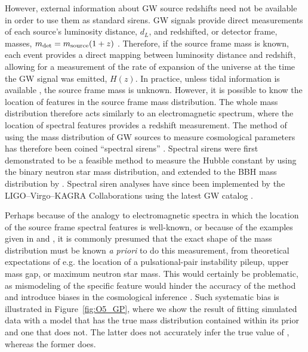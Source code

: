 \documentclass[]{aastex631}
\begin{document}
However, external information about \ac{GW} source redshifts need not be available in order to use them as standard sirens.
\ac{GW} signals provide direct measurements of each source's luminosity distance, $d_L$, and redshifted, or detector frame, masses, $m_{\det}= m_{\text{source}}(1+z)$ \citep[e.g.][]{chen_mass-redshift_2019}.
Therefore, if the source frame mass is known, each event provides a direct mapping between luminosity distance and redshift, allowing for a measurement of the rate of expansion of the universe at the time the \ac{GW} signal was emitted, $H(z)$.
In practice, unless tidal information is available \citep{messenger_measuring_2012}, the source frame mass is unknown.
However, it is possible to know the location of features in the source frame mass distribution.
The whole mass distribution therefore acts similarly to an electromagnetic spectrum, where the location of spectral features provides a redshift measurement.
The method of using the mass distribution of \ac{GW} sources to measure cosmological parameters has therefore been coined ``spectral sirens'' \citep{ezquiaga_spectral_2022}.
Spectral sirens were first demonstrated to be a feasible method to measure the Hubble constant by \cite{chernoff_gravitational_1993,Taylor:2011fs} using the binary neutron star mass distribution, and extended to the \ac{BBH} mass distribution by \cite{farr_future_2019}. 
Spectral siren analyses have since been implemented by the LIGO--Virgo--KAGRA Collaborations using the latest \ac{GW} catalog \cite{gwtc3_cosmo}.

Perhaps because of the analogy to electromagnetic spectra in which the location of the source frame spectral features is well-known, or because of the examples given in \cite{farr_future_2019} and \cite{chernoff_gravitational_1993}, it is commonly presumed that the exact shape of the mass distribution must be known \emph{a priori} to do this measurement, from theoretical expectations of e.g. the location of a pulsational-pair instability pileup, upper mass gap, or maximum neutron star mass. 
This would certainly be problematic, as mismodeling of the specific feature would hinder the accuracy of the method and introduce biases in the cosmological inference \citep{Mukherjee:2021rtw,mastrogiovanni_importance_2021,pierra_study_2023}.
Such systematic bias is illustrated in Figure~\ref{fig:O5_GP}, where we show the result of fitting simulated data with a model that has the true mass distribution contained within its prior and one that does not. 
The latter does not accurately infer the true value of \Ho{}, whereas the former does.
\end{document}
